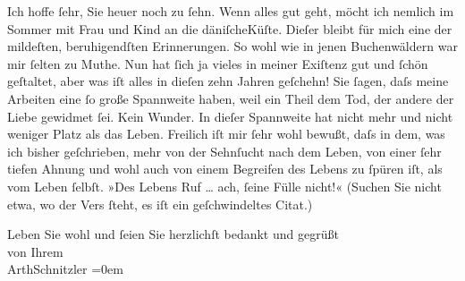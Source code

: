 \pstart
           Ich hoffe ſehr, Sie heuer noch zu ſehn. Wenn alles gut geht, möcht ich nemlich im
               Sommer mit Frau und Kind an die däniſcheKüſte. Dieſer \label{K_L01590-2v}\label{K_L01590-2} bleibt für mich eine der mildeſten, beruhigendſten Erinnerungen. So wohl wie
               in jenen Buchenwäldern war mir ſelten zu Muthe. Nun hat ſich ja vieles in meiner
               Exiſtenz gut und ſchön geſtaltet, aber was iſt alles in dieſen zehn Jahren geſchehn!
               Sie ſagen, daſs meine Arbeiten eine ſo große Spannweite haben, weil ein Theil dem
               Tod, der andere der Liebe gewidmet {\pb}ſei. Kein
               Wunder. In dieſer Spannweite hat nicht mehr und nicht weniger Platz als das Leben.
               Freilich iſt mir ſehr wohl bewußt, daſs in dem, was ich bisher geſchrieben, mehr von
               der Sehnſucht nach dem Leben, von einer ſehr tiefen Ahnung und wohl auch von einem
               Begreifen des Lebens zu ſpüren iſt, als vom Leben ſelbſt. »Des Lebens Ruf {\dots} ach, ſeine Fülle nicht!« (Suchen Sie nicht etwa, wo der
               Vers {\pb}ſteht, es iſt ein geſchwindeltes Citat.)\pend
           
\pstart
           Leben Sie wohl und ſeien Sie herzlichſt bedankt und gegrüßt{\\[\baselineskip]}von Ihrem{\\[\baselineskip]}\spacefill\mbox{ArthSchnitzler}\pend
           \leftskip=0em{}\endnumbering{}  
      